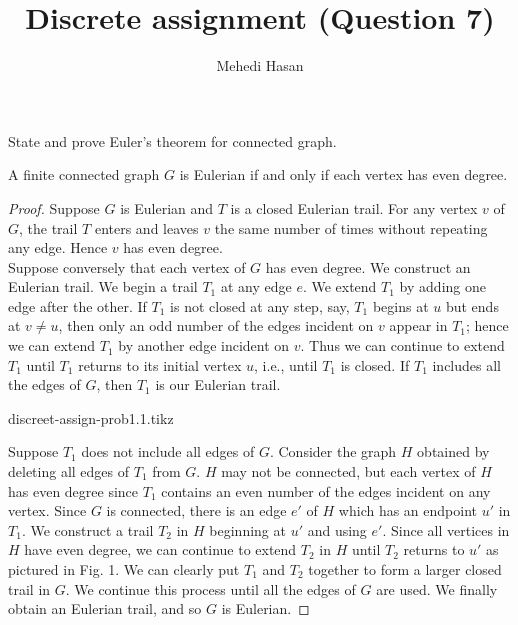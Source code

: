 \documentclass[12pt,class=article,crop=false]{standalone}
\begin{document}
\title{Discrete assignment (Question 7)}
\author{Mehedi Hasan}
\maketitle
\begin{prob*}
    State and prove Euler's theorem for connected graph.
\end{prob*}
\begin{soln}
    \begin{thm*}
        A finite connected graph $ G $ is Eulerian if and only if each vertex has even degree.
    \end{thm*}
    \begin{proof}
        Suppose $ G $ is Eulerian and $ T $ is a closed Eulerian trail. For any vertex $ v $ of $ G $, the trail $ T $ enters and leaves $ v $ the same number of times without repeating any edge. Hence $ v $ has even degree.\\

        Suppose conversely that each vertex of $ G $ has even degree. We construct an Eulerian trail. We begin a trail $ T_1 $ at any edge $ e $. We extend $ T_1 $ by adding one edge after the other. If $ T_1 $ is not closed at any step, say, $ T_1 $ begins at $ u $ but ends at $ v \neq u $, then only an odd number of the edges incident on $ v $ appear in $ T_1 $; hence we can extend $ T_1 $ by another edge incident on $ v $. Thus we can continue to extend $ T_1 $ until $ T_1 $ returns to its initial vertex $ u $, i.e., until $ T_1 $ is closed. If $ T_1 $ includes all the edges of $ G $, then $ T_1 $ is our Eulerian trail.\\

        \begin{center}
            {discreet-assign-prob1.1.tikz}
        \end{center}
        Suppose $ T_1 $ does not include all edges of $ G $. Consider the graph $ H $ obtained by deleting all edges of $ T_1 $ from $ G $. $ H $ may not be connected, but each vertex of $ H $ has even degree since $ T_1 $ contains an even number of the edges incident on any vertex. Since $ G $ is connected, there is an edge $ e' $ of $ H $ which has an endpoint $ u' $ in $ T_1 $. We construct a trail $ T_2 $ in $ H $ beginning at $ u' $ and using $ e' $. Since all vertices in $ H $ have even degree, we can continue to extend $ T_2 $ in $ H $ until $ T_2 $ returns to $ u' $ as pictured in Fig. 1. We can clearly put $ T_1 $ and $ T_2 $ together to form a larger closed trail in $ G $. We continue this process until all the edges of $ G $ are used. We finally obtain an Eulerian trail, and so $ G $ is Eulerian.
    \end{proof}
\end{soln}
\end{document}
